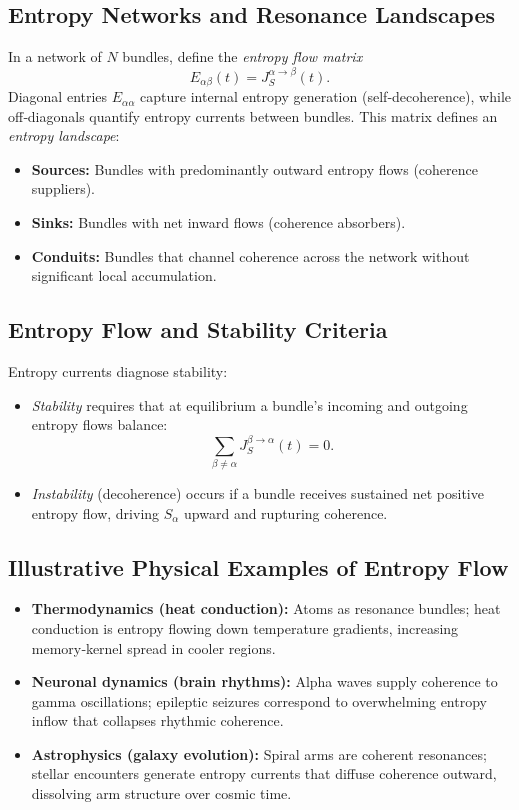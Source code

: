 \subsection{Entropy Networks and Resonance Landscapes}

In a network of \(N\) bundles, define the \emph{entropy flow matrix}
\begin{equation}
  E_{\alpha\beta}(t)
  = J_{S}^{\alpha\to\beta}(t).
\end{equation}
Diagonal entries \(E_{\alpha\alpha}\) capture internal entropy generation (self‐decoherence), while off‐diagonals quantify entropy currents between bundles.  This matrix defines an \emph{entropy landscape}:
\begin{itemize}
  \item \textbf{Sources:} Bundles with predominantly outward entropy flows (coherence suppliers).
  \item \textbf{Sinks:} Bundles with net inward flows (coherence absorbers).
  \item \textbf{Conduits:} Bundles that channel coherence across the network without significant local accumulation.
\end{itemize}

\subsection{Entropy Flow and Stability Criteria}

Entropy currents diagnose stability:
\begin{itemize}
  \item \emph{Stability} requires that at equilibrium a bundle’s incoming and outgoing entropy flows balance:
    \[
      \sum_{\beta\neq\alpha} J_{S}^{\beta\to\alpha}(t) = 0.
    \]
  \item \emph{Instability} (decoherence) occurs if a bundle receives sustained net positive entropy flow, driving \(S_{\alpha}\) upward and rupturing coherence.
\end{itemize}

\subsection{Illustrative Physical Examples of Entropy Flow}

\begin{itemize}
  \item \textbf{Thermodynamics (heat conduction):}  
    Atoms as resonance bundles; heat conduction is entropy flowing down temperature gradients, increasing memory‐kernel spread in cooler regions.
  \item \textbf{Neuronal dynamics (brain rhythms):}  
    Alpha waves supply coherence to gamma oscillations; epileptic seizures correspond to overwhelming entropy inflow that collapses rhythmic coherence.
  \item \textbf{Astrophysics (galaxy evolution):}  
    Spiral arms are coherent resonances; stellar encounters generate entropy currents that diffuse coherence outward, dissolving arm structure over cosmic time.
\end{itemize}

